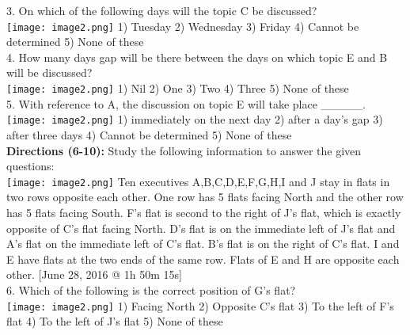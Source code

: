 \documentclass[
]{article}
\begin{document}
3. On which of the following days will the topic C be discussed?\\
\texttt{[image: image2.png]}
1) Tuesday \hspace{2mm}2) Wednesday \hspace{2mm}3) Friday
\hspace{2mm}4) Cannot be determined \hspace{2mm}5) None of these\\

4. How many days gap will be there between the days on which topic E and B will be
discussed?\\
\texttt{[image: image2.png]}
1) Nil \hspace{2mm}2) One \hspace{2mm}3) Two \hspace{2mm}4) Three \hspace{2mm}5) None of these\\

5. With reference to A, the discussion on topic E will take place \_\_\_\_\_.\\
\texttt{[image: image2.png]}
1) immediately on the next day \hspace{2mm}2) after a day’s gap \hspace{2mm}3) after three days
\hspace{2mm}4) Cannot be determined \hspace{2mm}5) None of these\\

\textbf{Directions (6-10):} Study the following information to answer the given questions:\\
\texttt{[image: image2.png]}
Ten
executives A,B,C,D,E,F,G,H,I and J stay in flats in two rows opposite each other. One row has 5
flats facing North and the other row has 5 flats facing South. F’s flat is second to the right of J’s
flat, which is exactly opposite of C’s flat facing North. D’s flat is on the immediate left of J’s flat
and A’s flat on the immediate left of C’s flat. B’s flat is on the right of C’s flat. I and E have flats
at the two ends of the same row. Flats of E and H are opposite each other.
[June 28, 2016 @ 1h 50m 15s]\\

6. Which of the following is the correct position of G’s flat?\\
\texttt{[image: image2.png]}
1) Facing North \hspace{2mm}2) Opposite C’s flat \hspace{2mm}3) To the left of F’s flat
\hspace{2mm}4) To the left of J’s flat \hspace{2mm}5) None of these\\
\end{document}
